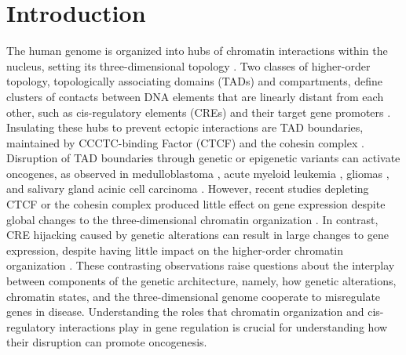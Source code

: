 \section{Introduction}

The human genome is organized into hubs of chromatin interactions within the nucleus, setting its three-dimensional topology \cite{finnMolecularBasisBiological2019}.
Two classes of higher-order topology, topologically associating domains (TADs) and compartments, define clusters of contacts between DNA elements that are linearly distant from each other, such as cis-regulatory elements (CREs) and their target gene promoters \cite{dixonTopologicalDomainsMammalian2012,noraSpatialPartitioningRegulatory2012}.
Insulating these hubs to prevent ectopic interactions are TAD boundaries, maintained by CCCTC-binding Factor (CTCF) and the cohesin complex \cite{pomboThreedimensionalGenomeArchitecture2015}.
Disruption of TAD boundaries through genetic or epigenetic variants can activate oncogenes, as observed in medulloblastoma \cite{northcottEnhancerHijackingActivates2014}, acute myeloid leukemia \cite{groschelSingleOncogenicEnhancer2014}, gliomas \cite{flavahanInsulatorDysfunctionOncogene2016}, and salivary gland acinic cell carcinoma \cite{hallerEnhancerHijackingActivates2019}.
However, recent studies depleting CTCF or the cohesin complex produced little effect on gene expression despite global changes to the three-dimensional chromatin organization \cite{oudelaarRelationshipGenomeStructure2020,despangFunctionalDissectionSox92019,williamsonDevelopmentallyRegulatedShh2019}.
In contrast, CRE hijacking caused by genetic alterations can result in large changes to gene expression, despite having little impact on the higher-order chromatin organization \cite{northcottEnhancerHijackingActivates2014,zhouEmergenceNoncodingCancer2016}.
These contrasting observations raise questions about the interplay between components of the genetic architecture, namely, how genetic alterations, chromatin states, and the three-dimensional genome cooperate to misregulate genes in disease.
Understanding the roles that chromatin organization and cis-regulatory interactions play in gene regulation is crucial for understanding how their disruption can promote oncogenesis.

